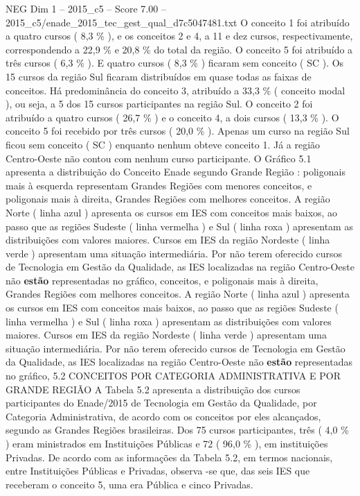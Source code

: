 \begin{textsample}{NEG Dim 1 – 2015\_c5 – Score 7.00 – 2015\_c5/enade\_2015\_tec\_gest\_qual\_d7c5047481.txt}
O conceito 1 foi atribuído a quatro cursos ( 8,3 \% ), e os conceitos 2 e 4, a 11 e dez cursos, respectivamente, correspondendo a 22,9 \% e 20,8 \% do total da região.
O conceito 5 foi atribuído a três cursos ( 6,3 \% ).
E quatro cursos ( 8,3 \% ) ficaram sem conceito ( SC ).
Os 15 cursos da região Sul ficaram distribuídos em quase todas as faixas de conceitos.
Há predominância do conceito 3, atribuído a 33,3 \% ( conceito modal ), ou seja, a 5 dos 15 cursos participantes na região Sul.
O conceito 2 foi atribuído a quatro cursos ( 26,7 \% ) e o conceito 4, a dois cursos ( 13,3 \% ).
O conceito 5 foi recebido por três cursos ( 20,0 \% ).
Apenas um curso na região Sul ficou sem conceito ( SC ) enquanto nenhum obteve conceito 1.
Já a região Centro-Oeste não contou com nenhum curso participante.
O Gráfico 5.1 apresenta a distribuição do Conceito Enade segundo Grande Região : poligonais mais à esquerda representam Grandes Regiões com menores conceitos, e poligonais mais à direita, Grandes Regiões com melhores conceitos.
A região Norte ( linha azul ) apresenta os cursos em IES com conceitos mais baixos, ao passo que as regiões Sudeste ( linha vermelha ) e Sul ( linha roxa ) apresentam as distribuições com valores maiores.
Cursos em IES da região Nordeste ( linha verde ) apresentam uma situação intermediária.
Por não terem oferecido cursos de Tecnologia em Gestão da Qualidade, as IES localizadas na região Centro-Oeste não \textbf{estão} representadas no gráfico, conceitos, e poligonais mais à direita, Grandes Regiões com melhores conceitos.
A região Norte ( linha azul ) apresenta os cursos em IES com conceitos mais baixos, ao passo que as regiões Sudeste ( linha vermelha ) e Sul ( linha roxa ) apresentam as distribuições com valores maiores.
Cursos em IES da região Nordeste ( linha verde ) apresentam uma situação intermediária.
Por não terem oferecido cursos de Tecnologia em Gestão da Qualidade, as IES localizadas na região Centro-Oeste não \textbf{estão} representadas no gráfico, 5.2 CONCEITOS POR CATEGORIA ADMINISTRATIVA E POR GRANDE REGIÃO A Tabela 5.2 apresenta a distribuição dos cursos participantes do Enade/2015 de Tecnologia em Gestão da Qualidade, por Categoria Administrativa, de acordo com os conceitos por eles alcançados, segundo as Grandes Regiões brasileiras.
Dos 75 cursos participantes, três ( 4,0 \% ) eram ministrados em Instituições Públicas e 72 ( 96,0 \% ), em instituições Privadas.
De acordo com as informações da Tabela 5.2, em termos nacionais, entre Instituições Públicas e Privadas, observa -se que, das seis IES que receberam o conceito 5, uma era Pública e cinco Privadas.

\end{textsample}
